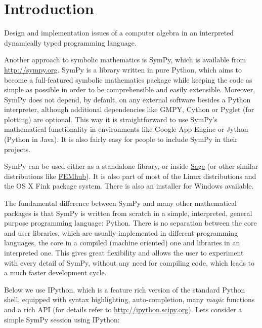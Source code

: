 
\section{Introduction}\label{thesis-introduction}

Design and implementation issues of a computer algebra in an interpreted dynamically typed programming language.

\cite{Ulmer1996kovacic}
\cite{Frink2001large}
\cite{Wang1976teaching}

Another approach to symbolic mathematics is SymPy, which is available
from \href{http://sympy.org}{http://sympy.org}.  SymPy is a library written in pure Python,
which aims to become a full-featured symbolic mathematics package
while keeping the code as simple as possible in order to be
comprehensible and easily extensible. Moreover, SymPy does not depend,
by default, on any external software besides a Python interpreter,
although additional dependencies like GMPY, Cython or Pyglet (for
plotting) are optional. This way it is straightforward to use SymPy's
mathematical functionality in environments like Google App Engine or
Jython (Python in Java). It is also fairly easy for people to include
SymPy in their projects.

SymPy can be used either as a standalone library, or inside \href{http://sagemath.org/}{Sage} (or other similar distributions like \href{http://femhub.org/}{FEMhub}). It is also part of most of the Linux
distributions and the OS X Fink package system. There is also an
installer for Windows available.

The fundamental difference between SymPy and many other mathematical
packages is that SymPy is written from scratch in a simple,
interpreted, general purpose programming language: Python.  There is
no separation between the core and user libraries, which are usually
implemented in different programming languages, the core in a compiled
(machine oriented) one and libraries in an interpreted one. This gives
great flexibility and allows the user to experiment with every detail
of SymPy, without any need for compiling code, which leads to a much
faster development cycle.

Below we use IPython, which is a feature rich version of the standard
Python shell, equipped with syntax highlighting, auto-completion, many
\emph{magic} functions and a rich API (for details refer to
\href{http://ipython.scipy.org}{http://ipython.scipy.org}). Lets consider a simple SymPy session using
IPython:

